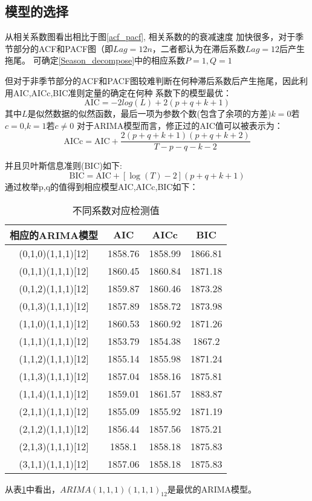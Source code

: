 \documentclass[12pt,a4paper]{nmmcm}
\begin{document}
  \subsection*{模型的选择}
  从相关系数图看出相比于图\ref{acf_pacf}, 相关系数的的衰减速度
  加快很多，对于季节部分的ACF和PACF图（即\(Lag=12n\)，二者都认为在滞后系数\(Lag=12\)后产生拖尾。
  可确定\ref{Season_decompose}中的相应系数\(P=1 , Q=1\)

  但对于非季节部分的ACF和PACF图较难判断在何种滞后系数后产生拖尾，因此利用AIC,AICc,BIC准则定量的确定在何种
  系数下的模型最优：
  \begin{equation*}
    \text{AIC} = -2log(L) + 2(p+q+k+1)
  \end{equation*}
  其中\(L\)是似然数据的似然函数，最后一项为参数个数(包含了余项的方差)\(k=0\)若\(c=0\),\(k=1\)若\(c\neq0\)
  对于ARIMA模型而言，修正过的AIC值可以被表示为：
  \begin{equation*}
    \text{AICc} = \text{AIC} + \frac{2(p+q+k+1)(p+q+k+2)}{T-p-q-k-2}
  \end{equation*}

  并且贝叶斯信息准则(BIC)如下:\[\text{BIC} = \text{AIC} + [\log(T)-2](p+q+k+1)\]
  通过枚举p,q的值得到相应模型AIC,AICc,BIC如下：
\begin{table}[H]
  \centering
  \caption{不同系数对应检测值}
    \begin{tabular}{cccc}
    相应的ARIMA模型 & AIC   & AICc  & BIC \\
    \hline
    (0,1,0)(1,1,1)[12] & 1858.76 & 1858.99 & 1866.81 \\
    (0,1,1)(1,1,1)[12] & 1860.45 & 1860.84 & 1871.18 \\
    (0,1,2)(1,1,1)[12] & 1859.87 & 1860.46 & 1873.28 \\
    (0,1,3)(1,1,1)[12] & 1857.89 & 1858.72 & 1873.98 \\
    (1,1,0)(1,1,1)[12] & 1860.53 & 1860.92 & 1871.26 \\
    (1,1,1)(1,1,1)[12] & 1853.79 & 1854.38 & 1867.2 \\
    (1,1,2)(1,1,1)[12] & 1855.14 & 1855.98 & 1871.24 \\
    (1,1,3)(1,1,1)[12] & 1857.04 & 1858.16 & 1875.81 \\
    (1,1,4)(1,1,1)[12] & 1859.01 & 1861.57 & 1883.87 \\
    (2,1,1)(1,1,1)[12] & 1855.09 & 1855.92 & 1871.19 \\
    (2,1,2)(1,1,1)[12] & 1856.44 & 1857.56 & 1875.21 \\
    (2,1,3)(1,1,1)[12] & 1858.1 & 1858.18 & 1875.83 \\
    (3,1,1)(1,1,1)[12] & 1857.06 & 1858.18 & 1875.83 \\
    \end{tabular}%
  \label{choose optimal models}%
\end{table}%
  从表\ref{choose optimal models}中看出，\(ARIMA(1,1,1)(1,1,1)_{12}\)是最优的ARIMA模型。
\end{document}
